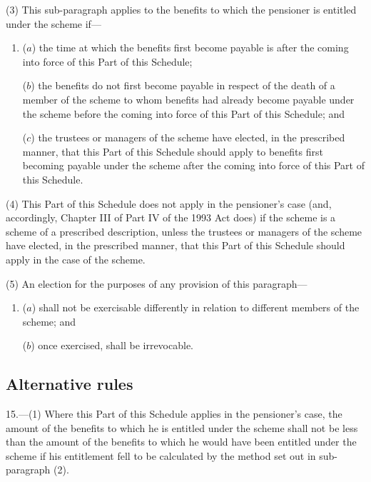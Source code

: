 \documentclass[12pt,a4paper]{article}
\begin{document}
(3) This sub-paragraph applies to the benefits to which the pensioner is entitled under the scheme if—
\begin{enumerate}\item[]
($a$) the time at which the benefits first become payable is after the coming into force of this Part of this Schedule;

($b$) the benefits do not first become payable in respect of the death of a member of the scheme to whom benefits had already become payable under the scheme before the coming into force of this Part of this Schedule; and

($c$) the trustees or managers of the scheme have elected, in the prescribed manner, that this Part of this Schedule should apply to benefits first becoming payable under the scheme after the coming into force of this Part of this Schedule.
\end{enumerate}

(4) This Part of this Schedule does not apply in the pensioner’s case (and, accordingly, Chapter III of Part IV of the 1993 Act does) if the scheme is a scheme of a prescribed description, unless the trustees or managers of the scheme have elected, in the prescribed manner, that this Part of this Schedule should apply in the case of the scheme.

(5) An election for the purposes of any provision of this paragraph—
\begin{enumerate}\item[]
($a$) shall not be exercisable differently in relation to different members of the scheme; and

($b$) once exercised, shall be irrevocable.
\end{enumerate}

\subsection*{Alternative rules}

15.---(1) Where this Part of this Schedule applies in the pensioner’s case, the amount of the benefits to which he is entitled under the scheme shall not be less than the amount of the benefits to which he would have been entitled under the scheme if his entitlement fell to be calculated by the method set out in sub-paragraph (2).
\end{document}
